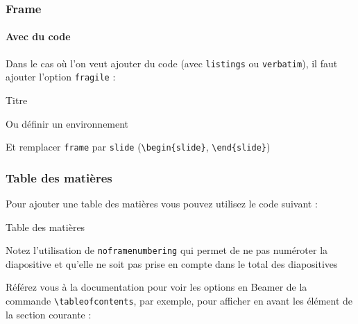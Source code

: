 \documentclass[french]{beamer}
\begin{document}
  \begin{slide}
    \frametitle{Frame}
    \framesubtitle{Avec du code}
    
    \begin{block}{} 
      Dans le cas où l'on veut ajouter du code (avec \verb!listings! ou \verb:verbatim:), il faut ajouter l'option \verb|fragile| :
      \begin{code}
        \begin{frame}[fragile]{Titre}
        \end{frame}
      \end{code}
    \end{block}
    
    \begin{block}{} 
      Ou définir un environnement
      \begin{code}
        \newenvironment{slide}
          {\begin{frame}[fragile,environment=slide]}
          {\end{frame}}
      \end{code}
      Et remplacer \verb:frame: par \verb:slide: (\verb:\begin{slide}:, \verb:\end{slide}:)
    \end{block}
  \end{slide}
    
  \begin{slide}
    \frametitle{Table des matières}
    
    \begin{block}{} 
      Pour ajouter une table des matières vous pouvez utilisez le code suivant :
      \begin{code}
        \begin{frame}[noframenumbering]{Table des matières}
          \tableofcontents
        \end{frame}
      \end{code}
      Notez l'utilisation de \verb:noframenumbering: qui permet de ne pas numéroter la diapositive et qu'elle ne soit pas prise en compte dans le total des diapositives
    \end{block}
    \begin{block}{}
      Référez vous à la documentation pour voir les options en Beamer de la commande \verb:\tableofcontents:, par exemple, pour afficher en avant les élément de la section courante :
      \begin{code}
        \tableofcontents[currentsection]
      \end{code}
    \end{block}
  \end{slide}
  
\end{document}
